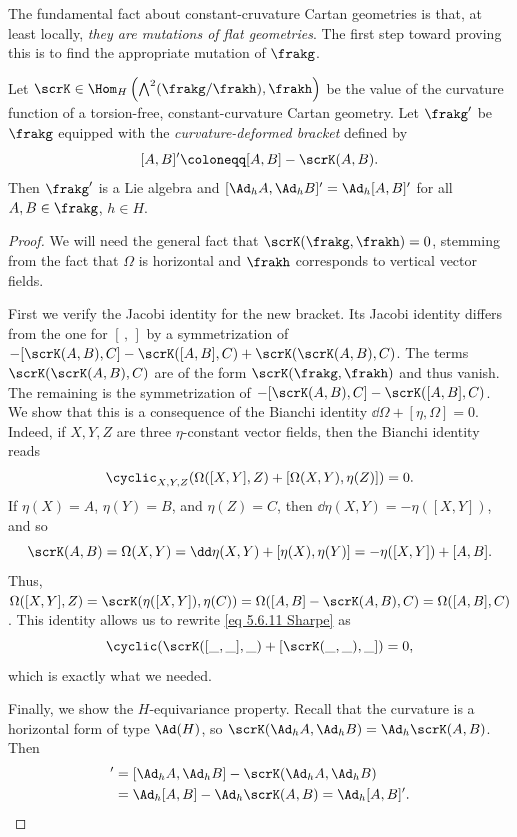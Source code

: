 The fundamental fact about constant-cruvature Cartan geometries is that, at least locally, \emph{they are mutations of flat geometries}. The first step toward proving this is to find the appropriate mutation of $\frakg$.

\begin{prop}\label{prop 5.6.8 Sharpe}
    Let $\scrK\in \Hom_H\left(\bigwedge\nolimits^2(\frakg\slash\frakh),\frakh\right)$ be the value of the curvature function of a torsion-free, constant-curvature Cartan geometry. Let $\frakg'$ be $\frakg$ equipped with the \emph{curvature-deformed bracket} defined by 
    \[[A,B]'\coloneqq [A,B]-\scrK(A,B).\label{eq deformed bracket}\] 
    Then $\frakg'$ is a Lie algebra and $[\Ad_h A,\Ad_h B]'=\Ad_h [A,B]'$ for all $A,B\in \frakg$, $h\in H$.
\end{prop}
\begin{proof}
    We will need the general fact that $\scrK(\frakg,\frakh)=0$, stemming from the fact that $\Omega$ is horizontal and $\frakh$ corresponds to vertical vector fields.

    First we verify the Jacobi identity for the new bracket. Its Jacobi identity differs from the one for $[\,,\,]$ by a symmetrization of $-[\scrK(A,B),C]-\scrK([A,B],C)+\scrK(\scrK(A,B),C)$. The terms $\scrK(\scrK(A,B),C)$ are of the form $\scrK(\frakg,\frakh)$ and thus vanish. The remaining is the symmetrization of $-[\scrK(A,B),C]-\scrK([A,B],C)$. We show that this is a consequence of the Bianchi identity $\dd \Omega+[\eta,\Omega]=0$. Indeed, if $X,Y,Z$ are three $\eta$-constant vector fields, then the Bianchi identity reads 
    \[\cyclic_{X,Y,Z}(\Omega([X,Y],Z)+[\Omega(X,Y),\eta(Z)])=0.\label{eq 5.6.11 Sharpe}\]
    If $\eta(X)=A$, $\eta(Y)=B$, and $\eta(Z)=C$, then $\dd\eta(X,Y)=-\eta([X,Y])$, and so 
    \[\scrK(A,B)=\Omega(X,Y)=\dd\eta(X,Y)+[\eta(X),\eta(Y)]=-\eta([X,Y])+[A,B].\]
    Thus, $\Omega([X,Y],Z)=\scrK(\eta([X,Y]),\eta(C))=\Omega([A,B]-\scrK(A,B),C)=\Omega([A,B],C)$. This identity allows us to rewrite \eqref{eq 5.6.11 Sharpe} as 
    \[\cyclic(\scrK([\_,\_],\_)+[\scrK(\_,\_),\_])=0,\]
    which is exactly what we needed.

    Finally, we show the $H$-equivariance property. Recall that the curvature is a horizontal form of type $\Ad(H)$, so $\scrK(\Ad_h A,\Ad_h B)=\Ad_h \scrK(A,B)$. Then 
    \begin{align}
        [\Ad_h A,\Ad_h B]'&=[\Ad_h A,\Ad_h B]-\scrK(\Ad_h A,\Ad_h B)\notag\\
        &=\Ad_h [A,B]-\Ad_h \scrK(A,B)=\Ad_h[A,B]'.
    \end{align}
\end{proof}


